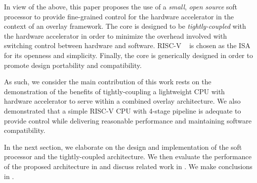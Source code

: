 

 

In view of the above, this paper proposes the use of a \emph{small}, \emph{open source} soft processor to provide fine-grained control for the hardware accelerator in the context of an overlay framework.
The core is designed to be \emph{tightly-coupled} with the hardware accelerator in order to minimize the overhead involved with switching control between hardware and software.
RISC-V ~\cite{riscv} is chosen as the ISA for its openness and simplicity.  Finally, the core is generically designed in order to promote design portability and compatibility.


As such, we consider the main contribution of this work rests on the demonstration of the benefits of tightly-coupling a lightweight CPU with hardware accelerator to serve within a combined overlay architecture.  We also demonstrated that a simple RISC-V CPU with 4-stage pipeline is adequate to provide control while delivering reasonable performance and maintaining software compatibility.

In the next section, we elaborate on the design and implementation of the soft processor and the tightly-coupled architecture. We then evaluate the performance of the proposed architecture in  and discuss related work in . We make conclusions in .

